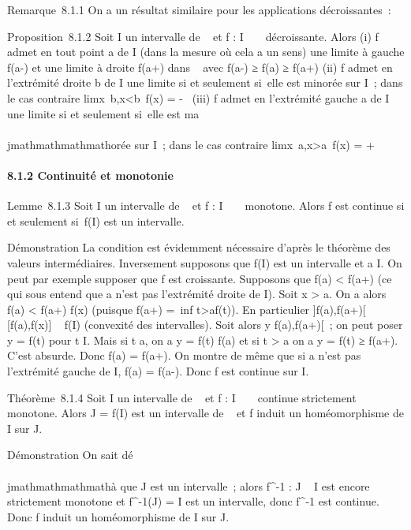 Remarque~8.1.1 On a un résultat similaire pour les applications
décroissantes~:

Proposition~8.1.2 Soit I un intervalle de ~ et f : I \rightarrow~ ~ décroissante.
Alors (i) f admet en tout point a de I (dans la mesure où cela a un
sens) une limite à gauche f(a-) et une limite à droite f(a+) dans ~ avec
f(a-) ≥ f(a) ≥ f(a+) (ii) f admet en l'extrémité droite b de I une
limite si et seulement si~elle est minorée sur I~; dans le cas contraire
limx\rightarrow~b,x\textless{}b~f(x) = -\infty~ (iii)
f admet en l'extrémité gauche a de I une limite si et seulement si~elle
est ma\\\\jmathmathmathmathorée sur I~; dans le cas contraire
limx\rightarrow~a,x\textgreater{}a~f(x) = +\infty~

\paragraph{8.1.2 Continuité et monotonie}

Lemme~8.1.3 Soit I un intervalle de ~ et f : I \rightarrow~ ~ monotone. Alors f est
continue si et seulement si~f(I) est un intervalle.

Démonstration La condition est évidemment nécessaire d'après le théorème
des valeurs intermédiaires. Inversement supposons que f(I) est un
intervalle et a \in I. On peut par exemple supposer que f est croissante.
Supposons que f(a) \textless{} f(a+) (ce qui sous entend que a n'est pas
l'extrémité droite de I). Soit x \textgreater{} a. On a alors f(a)
\textless{} f(a+) \leq f(x) (puisque f(a+) =\
inf t\textgreater{}af(t)). En particulier {]}f(a),f(a+){[}\subset~
{[}f(a),f(x){]} \subset~ f(I) (convexité des intervalles). Soit alors y
\in{]}f(a),f(a+){[}~; on peut poser y = f(t) pour t \in I. Mais si t \leq a, on
a y = f(t) \leq f(a) et si t \textgreater{} a on a y = f(t) ≥ f(a+). C'est
absurde. Donc f(a) = f(a+). On montre de même que si a n'est pas
l'extrémité gauche de I, f(a) = f(a-). Donc f est continue sur I.

Théorème~8.1.4 Soit I un intervalle de ~ et f : I \rightarrow~ ~ continue
strictement monotone. Alors J = f(I) est un intervalle de \mathbb{R}~ et f induit
un homéomorphisme de I sur J.

Démonstration On sait dé\\\\jmathmathmathmathà que J est un intervalle~; alors
f^-1 : J \rightarrow~ I est encore strictement monotone et
f^-1(J) = I est un intervalle, donc f^-1 est
continue. Donc f induit un homéomorphisme de I sur J.

